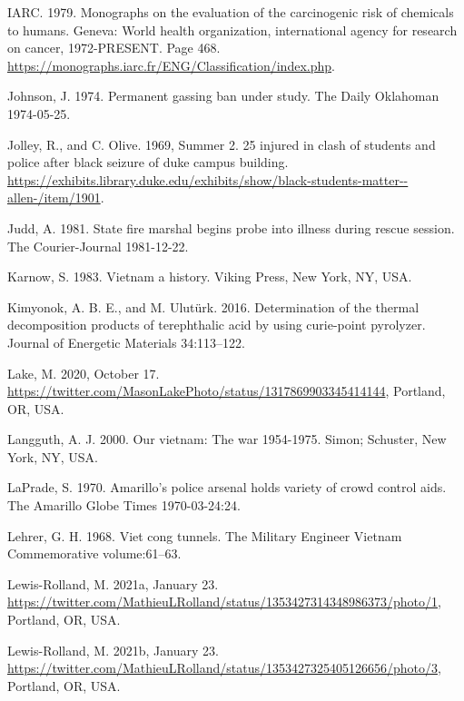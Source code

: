 \documentclass[
  11pt,
]{krantz}
\newlength{\cslhangindent}
\newlength{\cslentryspacingunit} %
\newenvironment{CSLReferences}[2] %
 {%
  \setlength{\parindent}{0pt}
  \ifodd #1
  \let\oldpar\par
  \def\par{\hangindent=\cslhangindent\oldpar}
  \fi
  \setlength{\parskip}{#2\cslentryspacingunit}
 }%
 {}
\begin{document}
\begin{CSLReferences}{1}{0}
\leavevmode{}%
IARC. 1979. Monographs on the evaluation of the carcinogenic risk of chemicals to humans. Geneva: World health organization, international agency for research on cancer, 1972-PRESENT. Page 468. \url{https://monographs.iarc.fr/ENG/Classification/index.php}.

\leavevmode{}%
Johnson, J. 1974. Permanent gassing ban under study. The Daily Oklahoman 1974-05-25.

\leavevmode{}%
Jolley, R., and C. Olive. 1969, Summer 2. 25 injured in clash of students and police after black seizure of duke campus building. \url{https://exhibits.library.duke.edu/exhibits/show/black-students-matter--allen-/item/1901}.

\leavevmode{}%
Judd, A. 1981. State fire marshal begins probe into illness during rescue session. The Courier-Journal 1981-12-22.

\leavevmode{}%
Karnow, S. 1983. Vietnam a history. Viking Press, New York, NY, USA.

\leavevmode{}%
Kimyonok, A. B. E., and M. Ulutürk. 2016. Determination of the thermal decomposition products of terephthalic acid by using curie-point pyrolyzer. Journal of Energetic Materials 34:113--122.

\leavevmode{}%
Lake, M. 2020, October 17. \url{https://twitter.com/MasonLakePhoto/status/1317869903345414144}, Portland, OR, USA.

\leavevmode{}%
Langguth, A. J. 2000. Our vietnam: The war 1954-1975. Simon; Schuster, New York, NY, USA.

\leavevmode{}%
LaPrade, S. 1970. Amarillo's police arsenal holds variety of crowd control aids. The Amarillo Globe Times 1970-03-24:24.

\leavevmode{}%
Lehrer, G. H. 1968. Viet cong tunnels. The Military Engineer Vietnam Commemorative volume:61--63.

\leavevmode{}%
Lewis-Rolland, M. 2021a, January 23. \url{https://twitter.com/MathieuLRolland/status/1353427314348986373/photo/1}, Portland, OR, USA.

\leavevmode{}%
Lewis-Rolland, M. 2021b, January 23. \url{https://twitter.com/MathieuLRolland/status/1353427325405126656/photo/3}, Portland, OR, USA.


\end{CSLReferences}
\end{document}
